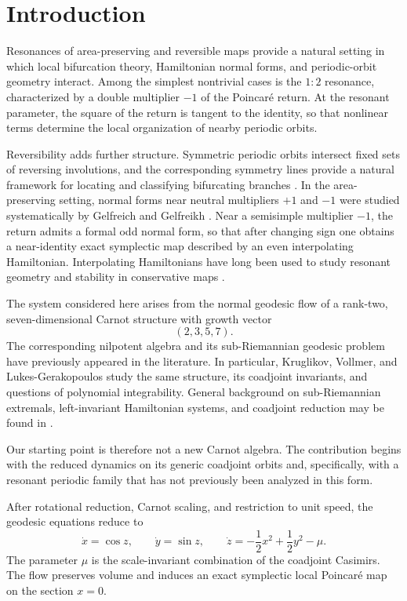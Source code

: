 \section{Introduction}
\label{sec:introduction}

Resonances of area-preserving and reversible maps provide a natural setting in which local bifurcation theory, Hamiltonian normal forms, and periodic-orbit geometry interact. Among the simplest nontrivial cases is the \(1{:}2\) resonance, characterized by a double multiplier \(-1\) of the Poincaré return. At the resonant parameter, the square of the return is tangent to the identity, so that nonlinear terms determine the local organization of nearby periodic orbits.

Reversibility adds further structure. Symmetric periodic orbits intersect fixed sets of reversing involutions, and the corresponding symmetry lines provide a natural framework for locating and classifying bifurcating branches \cite{Sevryuk1986,LambRoberts1998}. In the area-preserving setting, normal forms near neutral multipliers \(+1\) and \(-1\) were studied systematically by Gelfreich and Gelfreikh \cite{GelfreichGelfreikh2010}. Near a semisimple multiplier \(-1\), the return admits a formal odd normal form, so that after changing sign one obtains a near-identity exact symplectic map described by an even interpolating Hamiltonian. Interpolating Hamiltonians have long been used to study resonant geometry and stability in conservative maps \cite{BazzaniEtAl1993}.

The system considered here arises from the normal geodesic flow of a rank-two, seven-dimensional Carnot structure with growth vector
\[
(2,3,5,7).
\]
The corresponding nilpotent algebra and its sub-Riemannian geodesic problem have previously appeared in the literature. In particular, Kruglikov, Vollmer, and Lukes-Gerakopoulos \cite{KruglikovVollmerLukesGerakopoulos2017} study the same structure, its coadjoint invariants, and questions of polynomial integrability. General background on sub-Riemannian extremals, left-invariant Hamiltonian systems, and coadjoint reduction may be found in \cite{AgrachevSachkov2004,AgrachevBarilariBoscain2019}.

Our starting point is therefore not a new Carnot algebra. The contribution begins with the reduced dynamics on its generic coadjoint orbits and, specifically, with a resonant periodic family that has not previously been analyzed in this form.

After rotational reduction, Carnot scaling, and restriction to unit speed, the geodesic equations reduce to
\begin{equation}
\boxed{
\dot x=\cos z,\qquad
\dot y=\sin z,\qquad
\dot z=-\frac12x^2+\frac12y^2-\mu.
}
\label{eq:intro-reduced-flow}
\end{equation}
The parameter \(\mu\) is the scale-invariant combination of the coadjoint Casimirs. The flow preserves volume and induces an exact symplectic local Poincaré map on the section \(x=0\).

